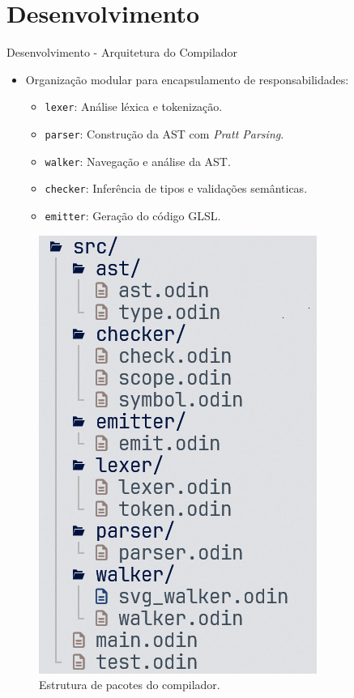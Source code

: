 \section{Desenvolvimento}

\begin{frame}{Desenvolvimento - Arquitetura do Compilador}
    \begin{itemize}
        \item Organização modular para encapsulamento de responsabilidades:
        \begin{itemize}
            \item \texttt{lexer}: Análise léxica e tokenização.
            \item \texttt{parser}: Construção da AST com \textit{Pratt Parsing}.
            \item \texttt{walker}: Navegação e análise da AST.
            \item \texttt{checker}: Inferência de tipos e validações semânticas.
            \item \texttt{emitter}: Geração do código GLSL.
        \end{itemize}
    \end{itemize}
    \begin{figure}
        \centering
        \includegraphics[scale=0.34]{./Imagens/package-structure.png}
        \caption{\small Estrutura de pacotes do compilador.}
    \end{figure}
\end{frame}


